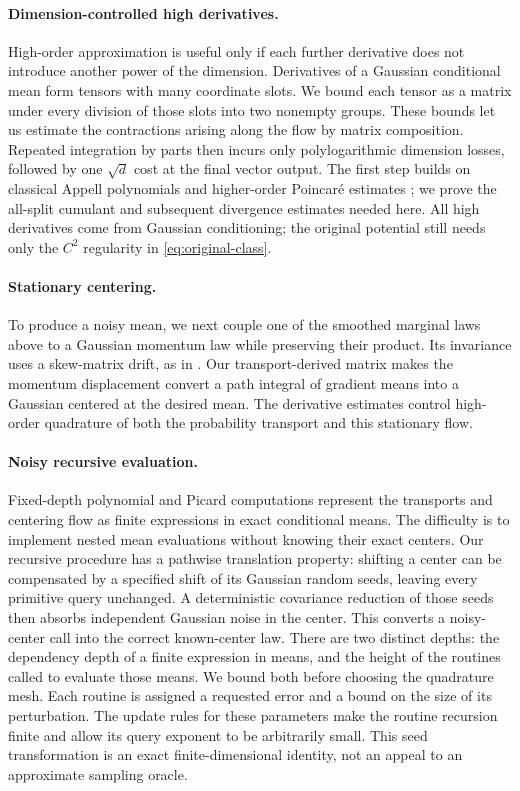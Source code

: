 \paragraph{Dimension-controlled high derivatives.}
High-order approximation is useful only if each further derivative
does not introduce another power of the dimension. Derivatives of a
Gaussian conditional mean form tensors with many coordinate slots.
We bound each tensor as a matrix under every division of those slots
into two nonempty groups. These bounds let us estimate the contractions
arising along the flow by matrix composition. Repeated integration by
parts then incurs only polylogarithmic dimension losses, followed by
one $\sqrt d$ cost at the final vector output. The first step builds
on classical Appell polynomials and higher-order Poincar\'e estimates
\citep{anshelevich2004appell,adamczak2015concentration,kothari2017agnostic};
we prove the all-split cumulant and subsequent divergence estimates
needed here. All high derivatives come from Gaussian conditioning;
the original potential still needs only the $C^2$ regularity in
\eqref{eq:original-class}.

\paragraph{Stationary centering.}
To produce a noisy mean, we next couple one of the smoothed marginal laws above
to a Gaussian momentum law while preserving their product.
Its invariance uses a skew-matrix drift, as in
\citet[Section~2.1]{ma2015recipe}. Our transport-derived matrix
makes the momentum displacement convert a path integral of gradient
means into a Gaussian centered at the desired mean.
The derivative estimates control high-order quadrature of both the
probability transport and this stationary flow.

\paragraph{Noisy recursive evaluation.}
Fixed-depth polynomial and Picard computations
represent the transports and centering flow as
finite expressions in exact conditional means.
The difficulty is to implement nested mean
evaluations without knowing their exact centers.
Our recursive procedure has a pathwise
translation property: shifting a center can be
compensated by a specified shift of its Gaussian
random seeds, leaving every primitive query
unchanged. A deterministic covariance reduction
of those seeds then absorbs independent Gaussian
noise in the center. This converts a noisy-center
call into the correct known-center law.
There are two distinct depths: the dependency depth of a finite
expression in means, and the height of the routines called to evaluate
those means. We bound both before choosing the quadrature mesh.
Each routine is assigned a requested error and a bound on the size of
its perturbation. The update rules for these parameters make the routine
recursion finite and allow its query exponent to be arbitrarily small.
This seed transformation
is an exact finite-dimensional identity, not an
appeal to an approximate sampling oracle.


